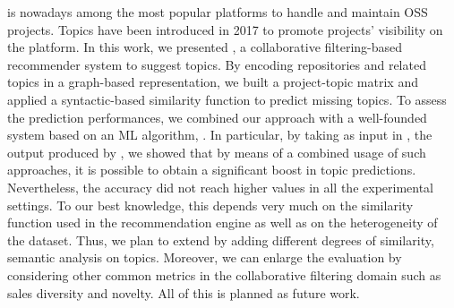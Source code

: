 \GH is nowadays among the most popular platforms to handle and maintain OSS projects. 
Topics have been introduced in 2017 to promote projects' visibility on the 
platform. 
In this work, we presented \TF, a collaborative filtering-based recommender 
system to suggest \GH topics.  By encoding repositories and related topics in a 
graph-based representation, we built a project-topic matrix and applied a 
syntactic-based similarity function to predict missing topics.
To assess the prediction performances, we combined our approach with a well-founded system based on an ML algorithm, \ie \MNB. In particular, by taking as input in \TF, the 
output produced by \MNB, we showed that by means of a combined usage of such 
approaches, it is possible to obtain a significant boost in topic predictions. 
Nevertheless, the accuracy did not reach higher values in all the experimental 
settings. To our best knowledge, this depends very much on the similarity function used in 
the recommendation engine as well as on the heterogeneity of the dataset. Thus, 
we plan to extend \TF by adding different degrees of similarity, \eg 
semantic analysis on topics. Moreover, we can enlarge the evaluation by 
considering other common metrics in the collaborative filtering domain such as 
sales diversity and novelty. All of this is planned as future work.
